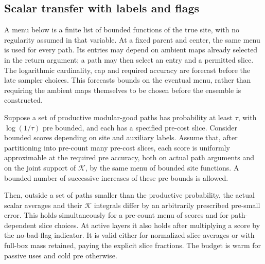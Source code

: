 \subsection{Scalar transfer with labels and flags}

A menu below is a finite list of bounded functions of the true site,
with no regularity assumed in that variable. At a fixed parent and
center, the same menu is used for every path. Its entries may depend
on ambient maps already selected in the return argument; a path may
then select an entry and a permitted slice. The logarithmic
cardinality, cap and required accuracy are forecast before the late
sampler choices. This forecasts bounds on the eventual menu, rather
than requiring the ambient maps themselves to be chosen before the
ensemble is constructed.

\begin{proposition}\label{ap:scalar:comparison}
Suppose a set of productive modular-good paths has probability at least
$\tau$, with $\log(1/\tau)$ pre bounded, and each has a specified
pre-cost slice. Consider bounded scores depending on site and auxiliary
labels. Assume that, after partitioning into pre-count many pre-cost
slices, each score is uniformly approximable at the required pre
accuracy, both on actual path arguments and on the joint support of
$\mathcal K$, by the same menu of bounded site functions. A bounded
number of successive increases of these pre bounds is allowed.

Then, outside a set of paths smaller than the productive probability,
the actual scalar averages and their $\mathcal K$ integrals differ by
an arbitrarily prescribed pre-small error. This holds simultaneously
for a pre-count menu of scores and for path-dependent slice choices.
At active layers it also holds after multiplying a score by the
no-bad-flag indicator. It is valid either for normalized slice averages
or with full-box mass retained, paying the explicit slice fractions.
The budget is warm for passive uses and cold pre otherwise.
\end{proposition}

